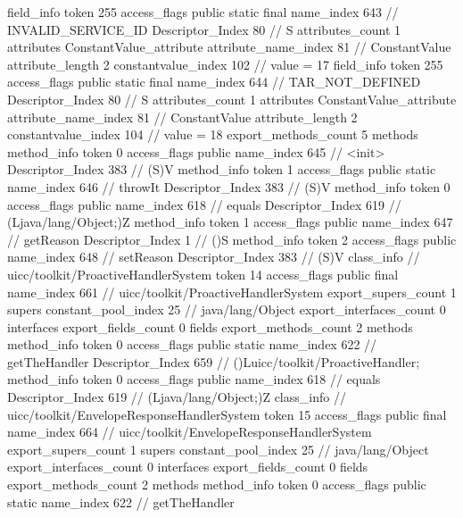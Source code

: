 {{{{{{{				}
				}
			}
			field_info {
				token	255
				access_flags	public static final
				name_index	643		// INVALID_SERVICE_ID
				Descriptor_Index	80		// S
				attributes_count	1
				attributes {
				ConstantValue_attribute {
					attribute_name_index	81		// ConstantValue
					attribute_length	2
					constantvalue_index	102		// value = 17
				}
				}
			}
			field_info {
				token	255
				access_flags	public static final
				name_index	644		// TAR_NOT_DEFINED
				Descriptor_Index	80		// S
				attributes_count	1
				attributes {
				ConstantValue_attribute {
					attribute_name_index	81		// ConstantValue
					attribute_length	2
					constantvalue_index	104		// value = 18
				}
				}
			}
			}
			export_methods_count	5
			methods {
				method_info {
					token	0
					access_flags	public
					name_index	645		// <init>
					Descriptor_Index	383		// (S)V
				}
				method_info {
					token	1
					access_flags	public static
					name_index	646		// throwIt
					Descriptor_Index	383		// (S)V
				}
				method_info {
					token	0
					access_flags	public
					name_index	618		// equals
					Descriptor_Index	619		// (Ljava/lang/Object;)Z
				}
				method_info {
					token	1
					access_flags	public
					name_index	647		// getReason
					Descriptor_Index	1		// ()S
				}
				method_info {
					token	2
					access_flags	public
					name_index	648		// setReason
					Descriptor_Index	383		// (S)V
				}
			}
		}
		class_info {		// uicc/toolkit/ProactiveHandlerSystem
			token	14
			access_flags	public final
			name_index	661		// uicc/toolkit/ProactiveHandlerSystem
			export_supers_count	1
			supers {
				constant_pool_index	25		// java/lang/Object
			}
			export_interfaces_count	0
			interfaces {
			}
			export_fields_count	0
			fields {
			}
			export_methods_count	2
			methods {
				method_info {
					token	0
					access_flags	public static
					name_index	622		// getTheHandler
					Descriptor_Index	659		// ()Luicc/toolkit/ProactiveHandler;
				}
				method_info {
					token	0
					access_flags	public
					name_index	618		// equals
					Descriptor_Index	619		// (Ljava/lang/Object;)Z
				}
			}
		}
		class_info {		// uicc/toolkit/EnvelopeResponseHandlerSystem
			token	15
			access_flags	public final
			name_index	664		// uicc/toolkit/EnvelopeResponseHandlerSystem
			export_supers_count	1
			supers {
				constant_pool_index	25		// java/lang/Object
			}
			export_interfaces_count	0
			interfaces {
			}
			export_fields_count	0
			fields {
			}
			export_methods_count	2
			methods {
				method_info {
					token	0
					access_flags	public static
					name_index	622		// getTheHandler
}}}}}
